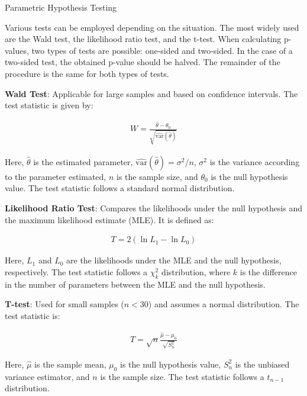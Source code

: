 \documentclass{beamer}
\begin{document}
\begin{columns}
\begin{column}{0.3\textwidth}

\begin{block}{Parametric Hypothesis Testing}

Various tests can be employed depending on the situation. The most widely used are the Wald test, the likelihood ratio test, and the t-test. When calculating p-values, two types of tests are possible: one-sided and two-sided. In the case of a two-sided test, the obtained p-value should be halved. The remainder of the procedure is the same for both types of tests.

\textbf{Wald Test}: Applicable for large samples and based on confidence intervals. The test statistic is given by:

\begin{align*}
    W = \frac{\hat{\theta} - \theta_0}{\sqrt{\hat{\text{var}}(\hat{\theta})}}
\end{align*}

Here, \(\hat{\theta}\) is the estimated parameter, \(\hat{\text{var}}(\hat{\theta}) = \sigma^2/n\), \(\sigma^2\) is the variance according to the parameter estimated, \(n\) is the sample size, and \(\theta_0\) is the null hypothesis value. The test statistic follows a standard normal distribution.

\textbf{Likelihood Ratio Test}: Compares the likelihoods under the null hypothesis and the maximum likelihood estimate (MLE). It is defined as:

\begin{align*}
    T = 2(\ln{L_1} - \ln{L_0})
\end{align*}

Here, \(L_1\) and \(L_0\) are the likelihoods under the MLE and the null hypothesis, respectively. The test statistic follows a \(\chi^2_k\) distribution, where \(k\) is the difference in the number of parameters between the MLE and the null hypothesis.

\textbf{T-test}: Used for small samples (\(n < 30\)) and assumes a normal distribution. The test statistic is:

\begin{align*}
    T = \sqrt{n} \frac{\hat{\mu} - \mu_0}{\sqrt{S^2_n}}
\end{align*}

Here, \(\hat{\mu}\) is the sample mean, \(\mu_0\) is the null hypothesis value, \(S^2_n\) is the unbiased variance estimator, and \(n\) is the sample size. The test statistic follows a \(t_{n-1}\) distribution.


\end{block}
\end{column}
\end{columns}
\end{document}

